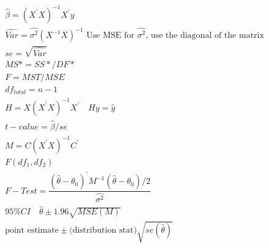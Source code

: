 \documentclass{article}
\newcommand{\sg}{\sigma}
\newcommand{\hb}{\hat{\beta}}
\newcommand{\hth}{\hat{\theta}}
\begin{document}
\begin{flushleft}
\begin{multline*}\\
\hb=(X^{'}X)^{-1}X^{'}y\\
\hat{Var}=\hat{\sg^2}(X^{-1}X)^{-1} \text{ Use MSE for } \hat{\sg^2} \text{, use the diagonal of the matrix}\\
se=\sqrt{\hat{Var}}\\
MS*=SS*/DF*\\
F=MST/MSE\\
df_{total}=n-1\\
H=X(X^{'}X)^{-1}X^{'} \quad Hy=\hat{y}\\
t-value=\hb/se\\
M=C(X^{'}X)^{-1}C^{'}\\
F(df_1,df_2)\\
F-Test=\dfrac{(\hth-\theta_0)^{'}M^{-1}(\hth-\theta_0)/2}{\hat{\sg^2}}\\
95\% CI \quad \hth\pm 1.96\sqrt{MSE(M)}\\
\text{point estimate}\pm \text{(distribution stat)}\sqrt{se(\hth)}\\
\end{multline*}


\end{flushleft}
\end{document}

